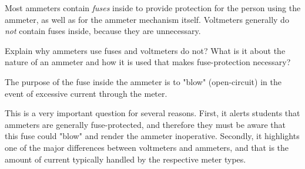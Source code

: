 

Most ammeters contain {\it fuses} inside to provide protection for the person using the ammeter, as well as for the ammeter mechanism itself.  Voltmeters generally do {\it not} contain fuses inside, because they are unnecessary.

Explain why ammeters use fuses and voltmeters do not?  What is it about the nature of an ammeter and how it is used that makes fuse-protection necessary?







The purpose of the fuse inside the ammeter is to "blow" (open-circuit) in the event of excessive current through the meter.







This is a very important question for several reasons.  First, it alerts students that ammeters are generally fuse-protected, and therefore they must be aware that this fuse could "blow" and render the ammeter inoperative.  Secondly, it highlights one of the major differences between voltmeters and ammeters, and that is the amount of current typically handled by the respective meter types.




